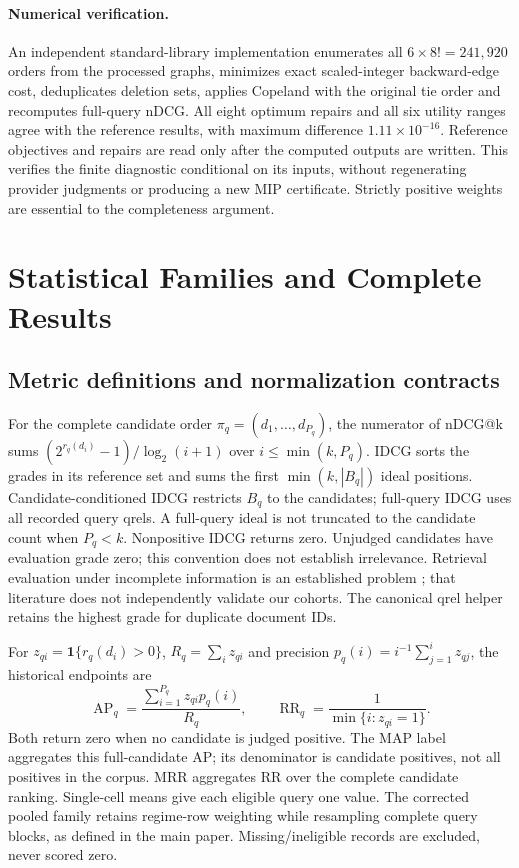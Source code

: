 \documentclass[pdflatex,sn-basic,Numbered]{sn-jnl}
\begin{document}
\paragraph{Numerical verification.}
An independent standard-library implementation enumerates all $6\times8!=241{,}920$ orders from the processed graphs, minimizes exact scaled-integer backward-edge cost, deduplicates deletion sets, applies Copeland with the original tie order and recomputes full-query nDCG. All eight optimum repairs and all six utility ranges agree with the reference results, with maximum difference $1.11\times10^{-16}$. Reference objectives and repairs are read only after the computed outputs are written. This verifies the finite diagnostic conditional on its inputs, without regenerating provider judgments or producing a new MIP certificate. Strictly positive weights are essential to the completeness argument.

\section{Statistical Families and Complete Results}\label{sec:si-statistics}
\subsection{Metric definitions and normalization contracts}
For the complete candidate order $\pi_q=(d_1,\ldots,d_{P_q})$, the numerator of nDCG@k sums $(2^{r_q(d_i)}-1)/\log_2(i+1)$ over $i\le\min(k,P_q)$. IDCG sorts the grades in its reference set and sums the first $\min(k,|B_q|)$ ideal positions. Candidate-conditioned IDCG restricts $B_q$ to the candidates; full-query IDCG uses all recorded query qrels. A full-query ideal is not truncated to the candidate count when $P_q<k$. Nonpositive IDCG returns zero. Unjudged candidates have evaluation grade zero; this convention does not establish irrelevance. Retrieval evaluation under incomplete information is an established problem \cite{buckley2004incomplete}; that literature does not independently validate our cohorts. The canonical qrel helper retains the highest grade for duplicate document IDs.

For $z_{qi}=\mathbf1\{r_q(d_i)>0\}$, $R_q=\sum_i z_{qi}$ and precision $p_q(i)=i^{-1}\sum_{j=1}^i z_{qj}$, the historical endpoints are
\begin{equation}
\operatorname{AP}_q=\frac{\sum_{i=1}^{P_q}z_{qi}p_q(i)}{R_q},\qquad
\operatorname{RR}_q=\frac{1}{\min\{i:z_{qi}=1\}}.
\label{eq:si-ap-rr}
\end{equation}
Both return zero when no candidate is judged positive. The MAP label aggregates this full-candidate AP; its denominator is candidate positives, not all positives in the corpus. MRR aggregates RR over the complete candidate ranking. Single-cell means give each eligible query one value. The corrected pooled family retains regime-row weighting while resampling complete query blocks, as defined in the main paper. Missing/ineligible records are excluded, never scored zero.
\end{document}
